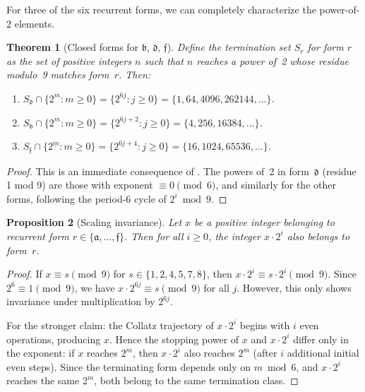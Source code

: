 \documentclass[11pt,a4paper]{article}
\theoremstyle{plain}
\newtheorem{theorem}{Theorem}[section]
\newtheorem{proposition}[theorem]{Proposition}
\theoremstyle{definition}
\begin{document}
For three of the six recurrent forms, we can completely characterize the power-of-2 elements.

\begin{theorem}[Closed forms for $\mathfrak{b}$, $\mathfrak{d}$, $\mathfrak{f}$]\label{thm:closed_forms}
  Define the \emph{termination set} $S_r$ for form $r$ as the set of positive integers $n$ such that $n$ reaches a power of~2 whose residue modulo~9 matches form~$r$. Then:
  \begin{enumerate}[label=(\roman*)]
    \item $S_{\mathfrak{d}} \cap \{2^m : m \geq 0\} = \{2^{6j} : j \geq 0\} = \{1, 64, 4096, 262144, \ldots\}$.
    \item $S_{\mathfrak{b}} \cap \{2^m : m \geq 0\} = \{2^{6j+2} : j \geq 0\} = \{4, 256, 16384, \ldots\}$.
    \item $S_{\mathfrak{f}} \cap \{2^m : m \geq 0\} = \{2^{6j+4} : j \geq 0\} = \{16, 1024, 65536, \ldots\}$.
  \end{enumerate}
\end{theorem}

\begin{proof}
  This is an immediate consequence of . The powers of~2 in form~$\mathfrak{d}$ (residue 1 mod 9) are those with exponent $\equiv 0 \pmod{6}$, and similarly for the other forms, following the period-6 cycle of $2^i \bmod 9$.
\end{proof}

\begin{proposition}[Scaling invariance]\label{prop:scaling}
  Let $x$ be a positive integer belonging to recurrent form $r \in \{\mathfrak{a}, \ldots, \mathfrak{f}\}$. Then for all $i \geq 0$, the integer $x \cdot 2^i$ also belongs to form~$r$.
\end{proposition}

\begin{proof}
  If $x \equiv s \pmod{9}$ for $s \in \{1,2,4,5,7,8\}$, then $x \cdot 2^i \equiv s \cdot 2^i \pmod{9}$. Since $2^6 \equiv 1 \pmod{9}$, we have $x \cdot 2^{6j} \equiv s \pmod{9}$ for all $j$. However, this only shows invariance under multiplication by $2^{6j}$.

  For the stronger claim: the Collatz trajectory of $x \cdot 2^i$ begins with $i$ even operations, producing $x$. Hence the stopping power of $x$ and $x \cdot 2^i$ differ only in the exponent: if $x$ reaches $2^m$, then $x \cdot 2^i$ also reaches $2^m$ (after $i$ additional initial even steps). Since the terminating form depends only on $m \bmod 6$, and $x \cdot 2^i$ reaches the same $2^m$, both belong to the same termination class.
\end{proof}
\end{document}
